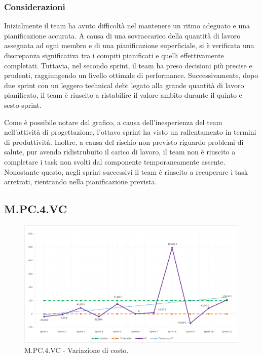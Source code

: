 \documentclass[10pt, a4paper]{article}
\begin{document}
\subsubsection{Considerazioni}
Inizialmente il team ha avuto difficoltà nel mantenere un ritmo adeguato e una pianificazione accurata.
A causa di una sovraccarico della quantità di lavoro assegnata ad ogni membro e di una pianificazione superficiale, si è verificata una discrepanza significativa tra i compiti pianificati e quelli effettivamente completati.
Tuttavia, nel secondo sprint, il team ha preso decisioni più precise e prudenti, raggiungendo un livello ottimale di performance.
Successivamente, dopo due sprint con un leggero technical debt legato alla grande quantità di lavoro pianificato, il team è riuscito a ristabilire il valore ambito durante il quinto e sesto sprint.

Come è possibile notare dal grafico, a causa dell'inesperienza del team nell'attività di progettazione, l'ottavo sprint ha visto un rallentamento in termini di produttività. Inoltre, a causa del rischio non previsto riguardo problemi di salute, pur avendo ridistrubuito il carico di lavoro, il team non è riuscito a completare i task non svolti dal componente temporaneamente assente. Nonostante questo, negli sprint successivi il team è riuscito a recuperare i task arretrati, rientrando nella pianificazione prevista.

\subsection{M.PC.4.VC}
\begin{figure}[H]
\includegraphics[width=15.5cm]{img/metriche/MPC4VC.png}
\caption{M.PC.4.VC - Variazione di costo.}
\end{figure}
\end{document}
